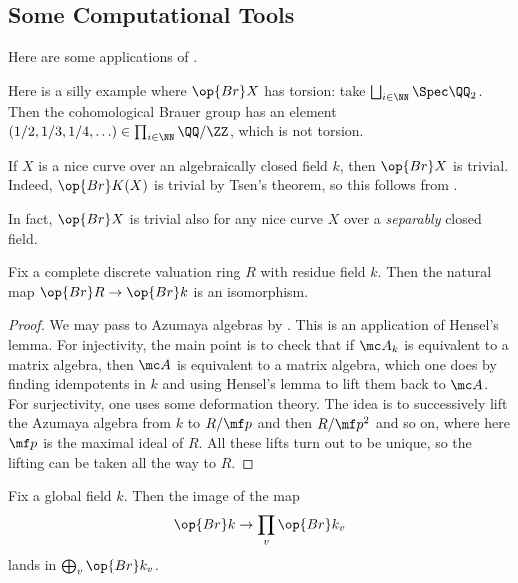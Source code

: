\documentclass[../notes.tex]{subfiles}
\begin{document}
\subsection{Some Computational Tools}
Here are some applications of .
\begin{example}
	Here is a silly example where $\op{Br}X$ has torsion: take $\bigsqcup_{i\in\NN}\Spec\QQ_2$. Then the cohomological Brauer group has an element $(1/2,1/3,1/4,\ldots)\in\prod_{i\in\NN}\QQ/\ZZ$, which is not torsion.
\end{example}
\begin{example}
	If $X$ is a nice curve over an algebraically closed field $k$, then $\op{Br}X$ is trivial. Indeed, $\op{Br}K(X)$ is trivial by Tsen's theorem, so this follows from .
\end{example}
\begin{remark} \label{rem:br-k-sep-curve}
	In fact, $\op{Br}X$ is trivial also for any nice curve $X$ over a \textit{separably} closed field.
\end{remark}
\begin{proposition} \label{prop:br-dvr}
	Fix a complete discrete valuation ring $R$ with residue field $k$. Then the natural map $\op{Br}R\to\op{Br}k$ is an isomorphism.
\end{proposition}
\begin{proof}
	We may pass to Azumaya algebras by . This is an application of Hensel's lemma. For injectivity, the main point is to check that if $\mc A_k$ is equivalent to a matrix algebra, then $\mc A$ is equivalent to a matrix algebra, which one does by finding idempotents in $k$ and using Hensel's lemma to lift them back to $\mc A$. For surjectivity, one uses some deformation theory. The idea is to successively lift the Azumaya algebra from $k$ to $R/\mf p$ and then $R/\mf p^2$ and so on, where here $\mf p$ is the maximal ideal of $R$. All these lifts turn out to be unique, so the lifting can be taken all the way to $R$.
\end{proof}
\begin{corollary}
	Fix a global field $k$. Then the image of the map
	\[\op{Br}k\to\prod_v\op{Br}k_v\]
	lands in $\bigoplus_v\op{Br}k_v$.
\end{corollary}
\end{document}
